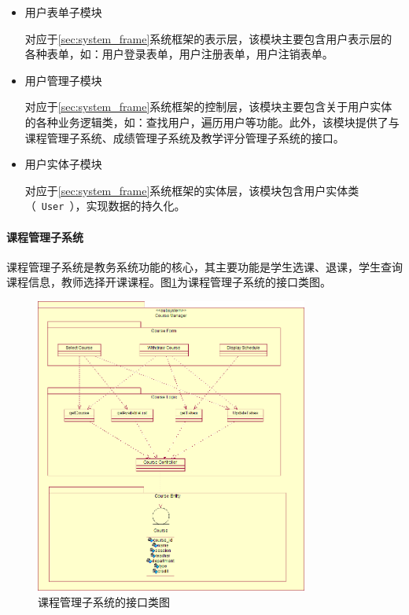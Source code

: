 \begin{itemize}
  \item 用户表单子模块
    
  \CJKindent 对应于\ref{sec:system_frame}系统框架的表示层，该模块主要包含用户表示层的各种表单，如：用户登录表单，用户注册表单，用户注销表单。
    
  \item 用户管理子模块
    
  \CJKindent 对应于\ref{sec:system_frame}系统框架的控制层，该模块主要包含关于用户实体的各种业务逻辑类，如：查找用户，遍历用户等功能。此外，该模块提供了与课程管理子系统、成绩管理子系统及教学评分管理子系统的接口。
    
  \item 用户实体子模块
    
  \CJKindent 对应于\ref{sec:system_frame}系统框架的实体层，该模块包含用户实体类（~\texttt{User}~），实现数据的持久化。
\end{itemize}
  
\paragraph{课程管理子系统}
  
课程管理子系统是教务系统功能的核心，其主要功能是学生选课、退课，学生查询课程信息，教师选择开课课程。图\ref{fig:subsystem_coursemgr_interface}为课程管理子系统的接口类图。
  
\begin{figure}[H]
  \centering
  \includegraphics[width=0.8\textwidth]{img/coursemgr_interface}
  \caption{课程管理子系统的接口类图}
  \label{fig:subsystem_coursemgr_interface}
\end{figure}
  
